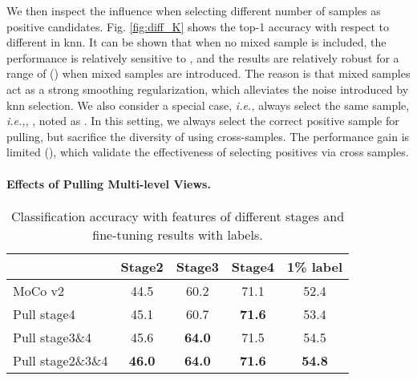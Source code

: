 \documentclass[10pt,twocolumn,letterpaper]{article}
\begin{document}
We then inspect the influence when selecting different number of samples as positive candidates. Fig. \ref{fig:diff_K} shows the top-1 accuracy with respect to different  in knn. It can be shown that when no mixed sample is included, the performance is relatively sensitive to , and the results are relatively robust for a range of  () when mixed samples are introduced. The reason is that mixed samples act as a strong smoothing regularization, which alleviates the noise introduced by knn selection. We also consider a special case, \emph{i.e.,} always select the same sample, \emph{i.e.,}, , noted as . In this setting, we always select the correct positive sample for pulling, but sacrifice the diversity of using cross-samples. The performance gain is limited (), which validate the effectiveness of selecting positives via cross samples.

\vspace{-0.15in}
\paragraph{Effects of Pulling Multi-level Views.}
\begin{table}[]
\renewcommand\arraystretch{1.1}
\setlength{\tabcolsep}{1.8mm}
\caption{Classification accuracy with features of different stages and fine-tuning results with  labels.}
\vspace{0.05in}
\begin{tabular}{lcccc}
\toprule
\multicolumn{1}{c}{} & Stage2 & Stage3 & Stage4 & 1\% label \\
\midrule
MoCo v2 \cite{chen2020improved}             & 44.5   & 60.2   & 71.1   & 52.4      \\
Pull stage4          & 45.1   & 60.7   & \textbf{71.6}   & 53.4      \\
Pull stage3\&4       & 45.6   & \textbf{64.0}   & 71.5   & 54.5      \\
Pull stage2\&3\&4    & \textbf{46.0}   & \textbf{64.0}   & \textbf{71.6}   & \textbf{54.8}      \\
\bottomrule
\end{tabular}
\label{tab: mulhead}
\end{table}
\end{document}
